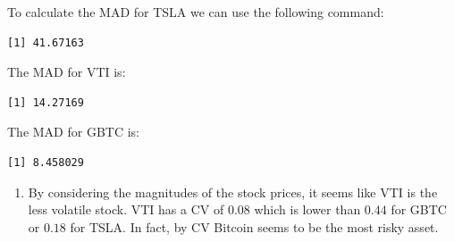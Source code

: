 \documentclass[
  letterpaper,
  DIV=11,
  numbers=noendperiod]{scrreprt}
\newenvironment{Shaded}{\begin{snugshade}}{\end{snugshade}}
\newcommand{\FunctionTok}[1]{\textcolor[rgb]{0.28,0.35,0.67}{#1}}
\newcommand{\NormalTok}[1]{\textcolor[rgb]{0.00,0.23,0.31}{#1}}
\newcommand{\OtherTok}[1]{\textcolor[rgb]{0.00,0.23,0.31}{#1}}
\newcommand{\SpecialCharTok}[1]{\textcolor[rgb]{0.37,0.37,0.37}{#1}}
\providecommand{\tightlist}{%
  \setlength{\itemsep}{0pt}\setlength{\parskip}{0pt}}\usepackage{longtable,booktabs,array}
\begin{document}
To calculate the MAD for TSLA we can use the following command:

\begin{Shaded}
\end{Shaded}

\begin{verbatim}
[1] 41.67163
\end{verbatim}

The MAD for VTI is:

\begin{Shaded}
\end{Shaded}

\begin{verbatim}
[1] 14.27169
\end{verbatim}

The MAD for GBTC is:

\begin{Shaded}
\end{Shaded}

\begin{verbatim}
[1] 8.458029
\end{verbatim}

\begin{blackbox}

\begin{enumerate}
\def\labelenumi{\arabic{enumi}.}
\setcounter{enumi}{2}
\tightlist
\item
  By considering the magnitudes of the stock prices, it seems like VTI
  is the less volatile stock. VTI has a CV of \(0.08\) which is lower
  than \(0.44\) for GBTC or \(0.18\) for TSLA. In fact, by CV Bitcoin
  seems to be the most risky asset.
\end{enumerate}

\end{blackbox}
\end{document}
